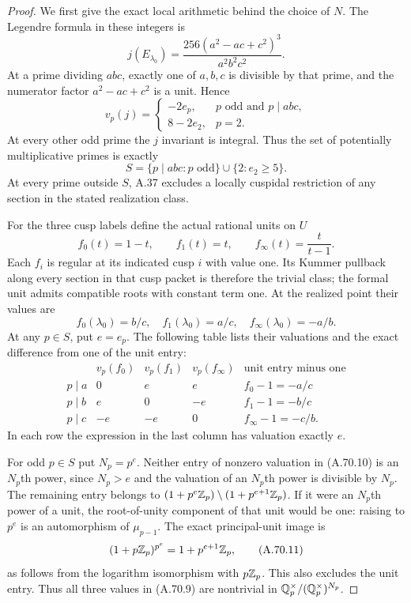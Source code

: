 \begin{proof}
We first give the exact local arithmetic behind the
choice of $N$.  The Legendre formula in these integers is
\[
             j(E_{\lambda_0})=
             \frac{256(a^2-ac+c^2)^3}{a^2b^2c^2}.
\tag{A.70.5}
\]
At a prime dividing $abc$, exactly one of $a,b,c$ is
divisible by that prime, and the numerator factor
$a^2-ac+c^2$ is a unit.  Hence
\[
 v_p(j)=
 \begin{cases}
       -2e_p,&p\text{ odd and }p\mid abc,\\
       8-2e_2,&p=2.
 \end{cases}
\tag{A.70.6}
\]
At every other odd prime the $j$ invariant is integral.
Thus the set of potentially multiplicative primes is
exactly
\[
 S=\{p\mid abc:p\text{ odd}\}
                 \cup\{2:e_2\ge5\}.
\tag{A.70.7}
\]
At every prime outside $S$, A.37 excludes a locally
cuspidal restriction of any section in the stated
realization class.

For the three cusp labels define the actual rational
units on $U$
\[
        f_0(t)=1-t,\qquad f_1(t)=t,\qquad
                        f_\infty(t)=\frac{t}{t-1}.
\tag{A.70.8}
\]
Each $f_i$ is regular at its indicated cusp $i$ with
value one.  Its Kummer pullback along every section in
that cusp packet is therefore the trivial class; the
formal unit admits compatible roots with constant
term one.  At the realized point their values are
\[
                  f_0(\lambda_0)=b/c,\quad
                  f_1(\lambda_0)=a/c,\quad
                  f_\infty(\lambda_0)=-a/b.
\tag{A.70.9}
\]
At any $p\in S$, put $e=e_p$.
The following table lists their valuations and the
exact difference from one of the unit entry:
\[
\begin{array}{c|ccc|c}
 &v_p(f_0)&v_p(f_1)&v_p(f_\infty)&
                         \text{unit entry minus one}\\ \hline
 p\mid a&0&e&e&f_0-1=-a/c\\
 p\mid b&e&0&-e&f_1-1=-b/c\\
 p\mid c&-e&-e&0&f_\infty-1=-c/b.
\end{array}
\tag{A.70.10}
\]
In each row the expression in the last column has
valuation exactly $e$.

For odd $p\in S$ put $N_p=p^e$.
Neither entry of nonzero valuation in (A.70.10) is
an $N_p$th power, since $N_p>e$ and the valuation
of an $N_p$th power is divisible by $N_p$.
The remaining entry belongs to
$(1+p^e\mathbb Z_p)\setminus(1+p^{e+1}\mathbb Z_p)$.
If it were an $N_p$th power of a unit, the
root-of-unity component of that unit would be one:
raising to $p^e$ is an automorphism of $\mu_{p-1}$.
The exact principal-unit image is
\[
             (1+p\mathbb Z_p)^{p^e}=1+p^{e+1}\mathbb Z_p,
\tag{A.70.11}
\]
as follows from the logarithm isomorphism with
$p\mathbb Z_p$.  This also excludes the unit entry.
Thus all three values in (A.70.9) are nontrivial
in $\mathbb Q_p^\times/(\mathbb Q_p^\times)^{N_p}$.


\end{proof}
